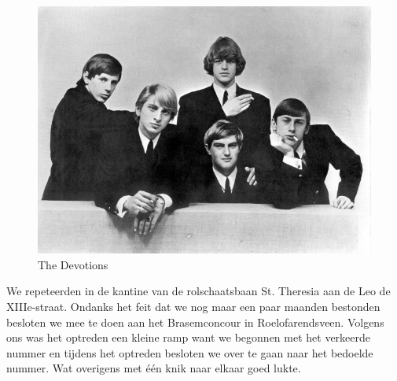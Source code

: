 \documentclass[12pt,twoside, openright]{memoir}
\begin{document}
\begin{figure}
\centering
\includegraphics[width=\textwidth]{img/ch27/promo3a}
\caption*{\footnotesize The Devotions}
\end{figure}

We repeteerden in de kantine van de rolschaatsbaan St. Theresia aan de Leo de XIIIe-straat. Ondanks het feit dat we nog maar een paar maanden bestonden besloten we mee te doen aan het Brasemconcour in Roelofarendsveen. Volgens ons was het optreden een kleine ramp want we begonnen met het verkeerde nummer en tijdens het optreden besloten we over te gaan naar het bedoelde nummer. Wat overigens met één knik naar elkaar goed lukte. 
\end{document}
